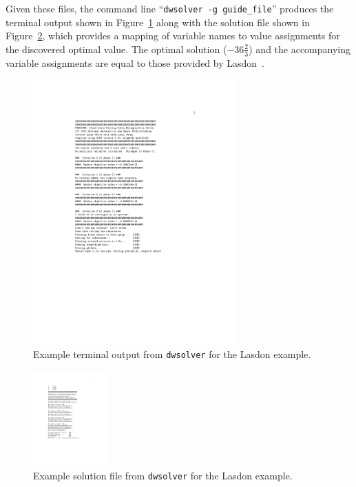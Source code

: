 \documentclass[11pt]{article} %
\begin{document}
Given these files, the command line ``{\tt dwsolver -g guide\_file}'' produces the terminal output shown in Figure~\ref{figTerminal} along with the solution file shown in Figure~\ref{figSolution}, which provides a mapping of variable names to value assignments for the discovered optimal value.  The optimal solution ($-36 \frac{2}{3}$) and the accompanying variable assignments are equal to those provided by Lasdon~\cite{Lasdon70}.
\begin{figure}[h!]
\begin{center}
\includegraphics[width=0.7\textwidth]{exampleOutput.pdf}
 \caption{\label{figTerminal} Example terminal output from {\tt dwsolver} for the Lasdon example.}
 \end{center}
\end{figure}
\begin{figure}[h!]
\begin{center}
\includegraphics[width=0.25\textwidth]{solution.pdf}
 \caption{\label{figSolution} Example solution file from {\tt dwsolver} for the Lasdon example.}
 \end{center}
\end{figure}
\clearpage


\end{document}
